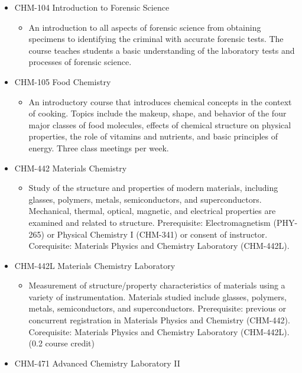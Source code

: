 \documentclass[
  letterpaper,
]{scrbook}
\providecommand{\tightlist}{%
  \setlength{\itemsep}{0pt}\setlength{\parskip}{0pt}}
\begin{document}
\begin{itemize}
\tightlist
\item
  CHM-104 Introduction to Forensic Science

  \begin{itemize}
  \tightlist
  \item
    An introduction to all aspects of forensic science from obtaining
    specimens to identifying the criminal with accurate forensic tests.
    The course teaches students a basic understanding of the laboratory
    tests and processes of forensic science.
  \end{itemize}
\item
  CHM-105 Food Chemistry

  \begin{itemize}
  \tightlist
  \item
    An introductory course that introduces chemical concepts in the
    context of cooking. Topics include the makeup, shape, and behavior
    of the four major classes of food molecules, effects of chemical
    structure on physical properties, the role of vitamins and
    nutrients, and basic principles of energy. Three class meetings per
    week.
  \end{itemize}
\item
  CHM-442 Materials Chemistry

  \begin{itemize}
  \tightlist
  \item
    Study of the structure and properties of modern materials, including
    glasses, polymers, metals, semiconductors, and superconductors.
    Mechanical, thermal, optical, magnetic, and electrical properties
    are examined and related to structure. Prerequisite:
    Electromagnetism (PHY-265) or Physical Chemistry I (CHM-341) or
    consent of instructor. Corequisite: Materials Physics and Chemistry
    Laboratory (CHM-442L).
  \end{itemize}
\item
  CHM-442L Materials Chemistry Laboratory

  \begin{itemize}
  \tightlist
  \item
    Measurement of structure/property characteristics of materials using
    a variety of instrumentation. Materials studied include glasses,
    polymers, metals, semiconductors, and superconductors. Prerequisite:
    previous or concurrent registration in Materials Physics and
    Chemistry (CHM-442). Corequisite: Materials Physics and Chemistry
    Laboratory (CHM-442L). (0.2 course credit)
  \end{itemize}
\item
  CHM-471 Advanced Chemistry Laboratory II


\end{itemize}
\end{document}
